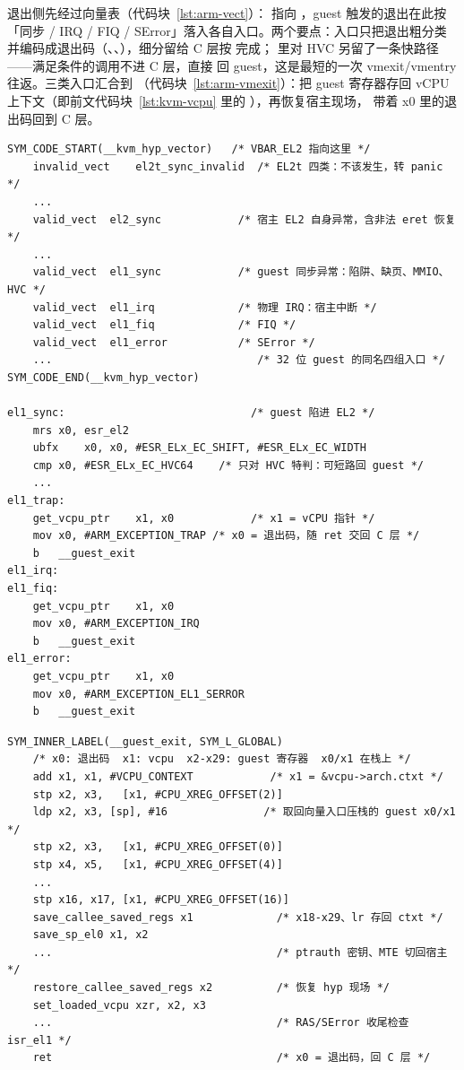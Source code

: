 退出侧先经过向量表（代码块~\ref{lst:arm-vect}）： 指向 ，guest 触发的退出在此按「同步 / IRQ / FIQ / SError」落入各自入口。两个要点：入口只把退出粗分类并编码成退出码（、、），细分留给 C 层按  完成； 里对 HVC 另留了一条快路径——满足条件的调用不进 C 层，直接  回 guest，这是最短的一次 vmexit/vmentry 往返。三类入口汇合到 （代码块~\ref{lst:arm-vmexit}）：把 guest 寄存器存回 vCPU 上下文（即前文代码块~\ref{lst:kvm-vcpu} 里的 ），再恢复宿主现场， 带着 x0 里的退出码回到 C 层。

\begin{lstlisting}[caption={vmexit 的落点：EL2 向量表按异常类型分流并编码退出码（arch/arm64/kvm/hyp/hyp-entry.S，节选）},label={lst:arm-vect}]
SYM_CODE_START(__kvm_hyp_vector)   /* VBAR_EL2 指向这里 */
	invalid_vect	el2t_sync_invalid  /* EL2t 四类：不该发生，转 panic */
	...
	valid_vect	el2_sync            /* 宿主 EL2 自身异常，含非法 eret 恢复 */
	...
	valid_vect	el1_sync            /* guest 同步异常：陷阱、缺页、MMIO、HVC */
	valid_vect	el1_irq             /* 物理 IRQ：宿主中断 */
	valid_vect	el1_fiq             /* FIQ */
	valid_vect	el1_error           /* SError */
	...                                /* 32 位 guest 的同名四组入口 */
SYM_CODE_END(__kvm_hyp_vector)

el1_sync:                             /* guest 陷进 EL2 */
	mrs	x0, esr_el2
	ubfx	x0, x0, #ESR_ELx_EC_SHIFT, #ESR_ELx_EC_WIDTH
	cmp	x0, #ESR_ELx_EC_HVC64    /* 只对 HVC 特判：可短路回 guest */
	...
el1_trap:
	get_vcpu_ptr	x1, x0            /* x1 = vCPU 指针 */
	mov	x0, #ARM_EXCEPTION_TRAP /* x0 = 退出码，随 ret 交回 C 层 */
	b	__guest_exit
el1_irq:
el1_fiq:
	get_vcpu_ptr	x1, x0
	mov	x0, #ARM_EXCEPTION_IRQ
	b	__guest_exit
el1_error:
	get_vcpu_ptr	x1, x0
	mov	x0, #ARM_EXCEPTION_EL1_SERROR
	b	__guest_exit
\end{lstlisting}

\begin{lstlisting}[caption={vmexit 的收尾：\_\_guest\_exit 把 guest 现场存回 vCPU 结构后返回 C 层（entry.S，节选）},label={lst:arm-vmexit}]
SYM_INNER_LABEL(__guest_exit, SYM_L_GLOBAL)
	/* x0: 退出码  x1: vcpu  x2-x29: guest 寄存器  x0/x1 在栈上 */
	add	x1, x1, #VCPU_CONTEXT            /* x1 = &vcpu->arch.ctxt */
	stp	x2, x3,   [x1, #CPU_XREG_OFFSET(2)]
	ldp	x2, x3, [sp], #16               /* 取回向量入口压栈的 guest x0/x1 */
	stp	x2, x3,   [x1, #CPU_XREG_OFFSET(0)]
	stp	x4, x5,   [x1, #CPU_XREG_OFFSET(4)]
	...
	stp	x16, x17, [x1, #CPU_XREG_OFFSET(16)]
	save_callee_saved_regs x1             /* x18-x29、lr 存回 ctxt */
	save_sp_el0	x1, x2
	...                                   /* ptrauth 密钥、MTE 切回宿主 */
	restore_callee_saved_regs x2          /* 恢复 hyp 现场 */
	set_loaded_vcpu xzr, x2, x3
	...                                   /* RAS/SError 收尾检查 isr_el1 */
	ret                                   /* x0 = 退出码，回 C 层 */
\end{lstlisting}

